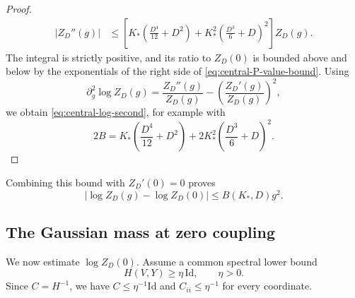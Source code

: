 \documentclass[10pt,reqno]{amsart}
\theoremstyle{definition}
\theoremstyle{remark}
\numberwithin{equation}{section}
\numberwithin{figure}{section}
\begin{document}
\begin{proof}
\begin{equation}
\begin{aligned}
|Z_D''(g)|&\le
\left[K_*\left(\frac{D^4}{12}+D^2\right)
+K_*^2\left(\frac{D^3}{6}+D\right)^2\right]Z_D(g).
\end{aligned}
\end{equation}
The integral is strictly positive, and its ratio to $Z_D(0)$ is bounded
above and below by the exponentials of the right side of
\eqref{eq:central-P-value-bound}. Using
\begin{equation}\label{eq:log-second-identity}
\partial_g^2\log Z_D(g)
=\frac{Z_D''(g)}{Z_D(g)}
-\left(\frac{Z_D'(g)}{Z_D(g)}\right)^2,
\end{equation}
we obtain \eqref{eq:central-log-second}, for example with
\begin{equation}\label{eq:central-B-choice}
2B=K_*\left(\frac{D^4}{12}+D^2\right)
+2K_*^2\left(\frac{D^3}{6}+D\right)^2.
\end{equation}
\end{proof}
Combining this bound with $Z_D'(0)=0$ proves
\begin{equation}\label{eq:central-log-quadratic}
|\log Z_D(g)-\log Z_D(0)|\le B(K_*,D)g^2.
\end{equation}

\subsection{The Gaussian mass at zero coupling}
We now estimate $\log Z_D(0)$. Assume a common spectral lower bound
\begin{equation}\label{eq:uniform-spectral-input}
H(V,Y)\ge\eta\,\mathrm{Id},\qquad\eta>0.
\end{equation}
Since $C=H^{-1}$, we have $C\le\eta^{-1}\mathrm{Id}$ and
$C_{ii}\le\eta^{-1}$ for every coordinate.
\end{document}
